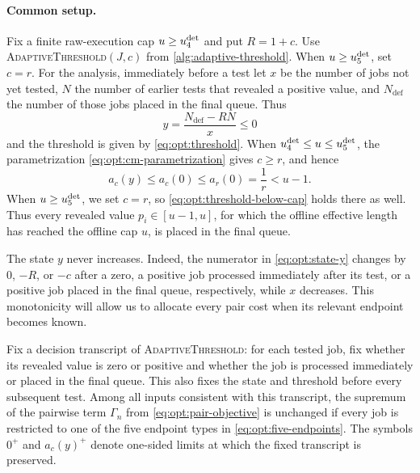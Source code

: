 \paragraph{Common setup.}
Fix a finite raw-execution cap $u\ge u_{4}^{\mathrm{det}}$ and put $R=1+c$.
Use \textsc{AdaptiveThreshold}$(J,c)$ from
\cref{alg:adaptive-threshold}.  When $u\ge u_{5}^{\mathrm{det}}$, set $c=r$.
For the analysis, immediately before a test let $x$ be the number of jobs not
yet tested, $N$ the number of earlier tests that revealed a positive value,
and $N_{\mathrm{def}}$ the number of those jobs placed in the final queue.
Thus
\begin{equation}
 y=\frac{N_{\mathrm{def}}-RN}{x}\le0
 \label{eq:opt:state-y}
\end{equation}
and the threshold is given by \cref{eq:opt:threshold}.  When
$u_{4}^{\mathrm{det}}\le u\le u_{5}^{\mathrm{det}}$, the parametrization
\cref{eq:opt:cm-parametrization} gives $c\ge r$, and hence
\begin{equation}
 a_c(y)\le a_c(0)\le a_r(0)=\frac1r<u-1.
 \label{eq:opt:threshold-below-cap}
\end{equation}
When $u\ge u_{5}^{\mathrm{det}}$, we set $c=r$, so
\cref{eq:opt:threshold-below-cap} holds there as well.
Thus every revealed value $p_i\in[u-1,u]$, for which the offline effective
length has reached the offline cap $u$, is placed in the final queue.

The state $y$ never increases.  Indeed, the numerator in
\eqref{eq:opt:state-y} changes by $0$, $-R$, or $-c$ after a zero, a
positive job processed immediately after its test, or a positive job placed
in the final queue, respectively, while $x$ decreases.  This monotonicity
will allow us to allocate every pair cost when its relevant endpoint becomes
known.

\begin{claim}
\label{clm:opt:adaptive-endpoint-reduction}
Fix a decision transcript of \textnormal{\textsc{AdaptiveThreshold}}: for each tested job,
fix whether its revealed value is zero or positive and whether the job is
processed immediately or placed in the final queue.  This also fixes the
state and threshold before every subsequent test.  Among all inputs
consistent with this transcript, the supremum of the pairwise term
$\Gamma_n$ from \cref{eq:opt:pair-objective} is unchanged if every job is
restricted to one of the five endpoint types in
\cref{eq:opt:five-endpoints}.  The symbols $0^+$ and $a_c(y)^+$ denote
one-sided limits at which the fixed transcript is preserved.
\end{claim}

